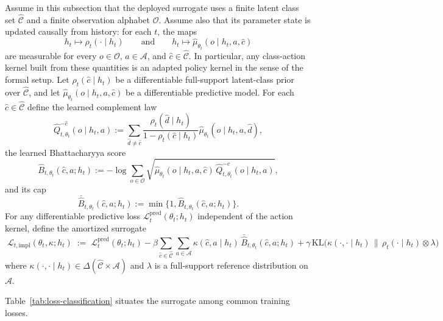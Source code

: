 \documentclass[11pt]{article}
\theoremstyle{definition}
\theoremstyle{remark}
\theoremstyle{plain}
\theoremstyle{definition}
\newcommand{\Acal}{\mathcal{A}}
\newcommand{\Ccal}{\mathcal{C}}
\newcommand{\Ocal}{\mathcal{O}}
\newcommand{\KL}{\mathrm{KL}}
\begin{document}
Assume in this subsection that the deployed surrogate uses a finite latent class set $\widehat{\Ccal}$ and a finite observation alphabet $\Ocal$. Assume also that its parameter state is updated causally from history: for each $t$, the maps
\[
h_t\longmapsto \rho_t(\cdot\mid h_t)
\qquad\text{and}\qquad
h_t\longmapsto \widehat\mu_{\theta_t}(o\mid h_t,a,\hat c)
\]
are measurable for every $o\in\Ocal$, $a\in\Acal$, and $\hat c\in\widehat{\Ccal}$. In particular, any class-action kernel built from these quantities is an adapted policy kernel in the sense of the formal setup. Let $\rho_t(\hat c\mid h_t)$ be a differentiable full-support latent-class prior over $\widehat{\Ccal}$, and let $\widehat\mu_{\theta_t}(o\mid h_t,a,\hat c)$ be a differentiable predictive model. For each $\hat c\in\widehat{\Ccal}$ define the learned complement law
\[
\widehat Q_{t,\theta_t}^{-\hat c}(o\mid h_t,a)
:=
\sum_{\hat d\neq \hat c}
\frac{\rho_t(\hat d\mid h_t)}{1-\rho_t(\hat c\mid h_t)}
\widehat\mu_{\theta_t}(o\mid h_t,a,\hat d),
\]
the learned Bhattacharyya score
\[
\widehat B_{t,\theta_t}(\hat c,a;h_t)
:=
-\log\sum_{o\in\Ocal}
\sqrt{
\widehat\mu_{\theta_t}(o\mid h_t,a,\hat c)\,
\widehat Q_{t,\theta_t}^{-\hat c}(o\mid h_t,a)},
\]
and its cap
\[
\bar{\widehat B}_{t,\theta_t}(\hat c,a;h_t)
:=
\min\{1,\widehat B_{t,\theta_t}(\hat c,a;h_t)\}.
\]
For any differentiable predictive loss $\mathcal L_t^{\mathrm{pred}}(\theta_t;h_t)$ independent of the action kernel, define the amortized surrogate
\[
\boxed{\;
\mathcal L_{t,\mathrm{impl}}(\theta_t,\kappa;h_t)
\;:=\;
\mathcal L_t^{\mathrm{pred}}(\theta_t;h_t)
-\beta\!
\sum_{\hat c\in\widehat{\Ccal}}\sum_{a\in\Acal}
\kappa(\hat c,a\mid h_t)\,\bar{\widehat B}_{t,\theta_t}(\hat c,a;h_t)
+\gamma\,
\KL\!\bigl(\kappa(\cdot,\cdot\mid h_t)\,\|\,\rho_t(\cdot\mid h_t)\otimes\lambda\bigr)
\;}
\]
where $\kappa(\cdot,\cdot\mid h_t)\in\Delta(\widehat{\Ccal}\times\Acal)$ and $\lambda$ is a full-support reference distribution on $\Acal$.

\bigskip

\noindent
Table~\ref{tab:loss-classification} situates the surrogate among common training losses.
\end{document}
